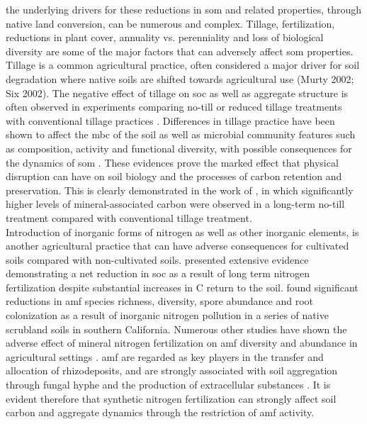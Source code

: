 		the underlying drivers for these reductions in \gls{som} and related properties, through native land conversion, can be numerous and complex. Tillage, fertilization, reductions in plant cover, annuality vs. perenniality and loss of biological diversity are some of the major factors that can adversely affect \gls{som} properties.
		Tillage is a common agricultural practice, often considered a major driver for soil degradation where native soils are shifted towards agricultural use (Murty 2002; Six 2002). The negative effect of tillage on \gls{soc} as well as aggregate structure is often observed in experiments comparing no-till or reduced tillage treatments with conventional tillage practices \citep{six1998, west2002}.
		Differences in tillage practice have  been shown to affect the \gls{mbc} of the soil \citep{jat2020, alvaro-fuentes2009, sun2011} as well as
		microbial community features such as composition, activity and functional diversity, with possible consequences for the dynamics of \gls{som} \citep{vangroenigen2010, govaerts2007}. These evidences prove the marked effect that physical disruption can have on soil biology and the processes of carbon retention and preservation. This is clearly demonstrated in the work of \citet{plaza2013}, in which significantly higher levels of mineral-associated carbon were observed in a long-term no-till treatment compared with conventional tillage treatment.\\
		Introduction of inorganic forms of nitrogen as well as other inorganic elements, is another agricultural practice that can have adverse consequences for cultivated soils compared with non-cultivated soils.  \citet{khan2007}   presented extensive evidence demonstrating a net reduction in \gls{soc} as a result of long term nitrogen fertilization despite substantial increases in C return to the soil. \citet{egerton-warburton2000} found significant reductions in \gls{amf}  species richness, diversity, spore abundance and root colonization as a result of inorganic nitrogen pollution in a series of native scrubland soils in southern California. Numerous other studies have shown the adverse effect of mineral nitrogen fertilization on \gls{amf} diversity and abundance in agricultural settings \citep{bradley2006,treseder2004,zhang2019,corkidi2002}.  \gls{amf} are regarded as key players in the transfer and allocation of rhizodeposits, and are strongly associated with soil aggregation through fungal hyphe and the production of extracellular substances \citep{rillig2006,leifheit2014,rillig2002}. It is evident therefore that synthetic nitrogen fertilization can strongly affect soil carbon and aggregate dynamics through the restriction of \gls{amf} activity.\\
